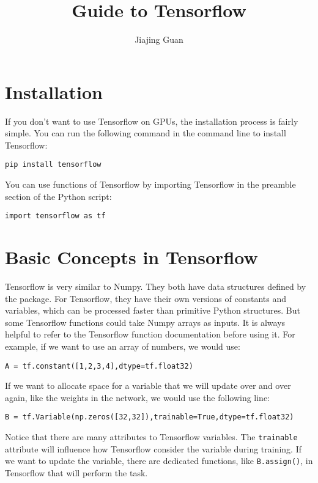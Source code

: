 \documentclass{article}
\title{Guide to Tensorflow}
\author{Jiajing Guan}
\begin{document}
\maketitle

\section{Installation}
If you don't want to use Tensorflow on GPUs, the installation process is fairly simple. You can run the following command in the command line to install Tensorflow:
\begin{center}
\texttt{pip install tensorflow}
\end{center}

You can use functions of Tensorflow by importing Tensorflow in the preamble section of the Python script:
\begin{center}
\texttt{import tensorflow as tf}
\end{center}

\section{Basic Concepts in Tensorflow}
Tensorflow is very similar to Numpy. They both have data structures defined by the package. For Tensorflow, they have their own versions of constants and variables, which can be processed faster than primitive Python structures. But some Tensorflow functions could take Numpy arrays as inputs. It is always helpful to refer to the Tensorflow function documentation before using it. For example, if we want to use an array of numbers, we would use:
\begin{center}
\texttt{A = tf.constant([1,2,3,4],dtype=tf.float32)}
\end{center}

If we want to allocate space for a variable that we will update over and over again, like the weights in the network, we would use the following line:
\begin{center}
\texttt{B = tf.Variable(np.zeros([32,32]),trainable=True,dtype=tf.float32)}
\end{center}

Notice that there are many attributes to Tensorflow variables. The \texttt{trainable} attribute will influence how Tensorflow consider the variable during training. If we want to update the variable, there are dedicated functions, like \texttt{B.assign()}, in Tensorflow that will perform the task. \\
\end{document}
